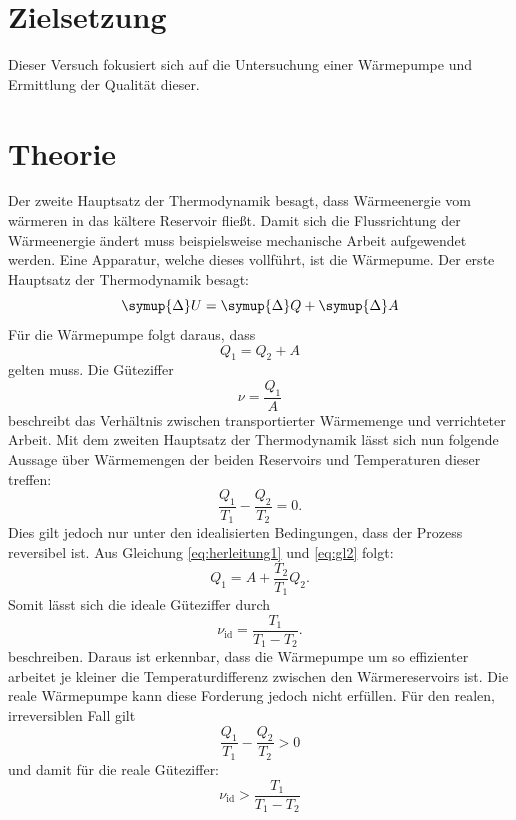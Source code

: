 \section{Zielsetzung}
Dieser Versuch fokusiert sich auf die Untersuchung einer Wärmepumpe und Ermittlung der Qualität dieser.
\section{Theorie}
\label{sec:Theorie}
Der zweite Hauptsatz der Thermodynamik besagt, dass Wärmeenergie vom wärmeren in das kältere Reservoir fließt.
Damit sich die Flussrichtung der Wärmeenergie ändert muss beispielsweise mechanische Arbeit aufgewendet werden.
Eine Apparatur, welche dieses vollführt, ist die Wärmepume.
Der erste Hauptsatz der Thermodynamik besagt:
\begin{equation}
	\symup{\Delta} U = \symup{\Delta} Q + \symup{\Delta} A
\end{equation}
Für die Wärmepumpe folgt daraus, dass
\begin{equation}
	\label{eq:herleitung1}
	Q_1 = Q_2 + A
\end{equation}
gelten muss.
Die Güteziffer
%
\begin{equation}
	\label{eq:gl1}
	\nu=\frac{Q_1}{A}
\end{equation}
%
beschreibt das Verhältnis zwischen transportierter Wärmemenge und verrichteter Arbeit.
Mit dem zweiten Hauptsatz der Thermodynamik lässt sich nun folgende Aussage über Wärmemengen der beiden Reservoirs und Temperaturen dieser treffen:
\begin{equation}
		\label{eq:gl2}
	\frac{Q_1}{T_1}-\frac{Q_2}{T_2}=0.
\end{equation}
Dies gilt jedoch nur unter den idealisierten Bedingungen, dass der Prozess reversibel ist.
Aus Gleichung \eqref{eq:herleitung1} und \eqref{eq:gl2} folgt:
\begin{equation}
	Q_1 = A + \frac{T_2}{T_1} Q_2 .
\end{equation}
Somit lässt sich die ideale Güteziffer durch
\begin{equation}
	\nu_{\text{id}}=\frac{T_1}{T_1-T_2}.
	\label{eq:guetezifferideal}
\end{equation}
beschreiben.
Daraus ist erkennbar, dass die Wärmepumpe um so effizienter arbeitet je kleiner die Temperaturdifferenz zwischen den Wärmereservoirs ist.
Die reale Wärmepumpe kann diese Forderung jedoch nicht erfüllen.
Für den realen, irreversiblen Fall gilt
\begin{equation}
		\label{eq:gl3}
	\frac{Q_1}{T_1}-\frac{Q_2}{T_2}>0
\end{equation}
und damit für die reale Güteziffer:
\begin{equation}
\nu_{\text{id}} > \frac{T_1}{T_1-T_2}
\end{equation}
